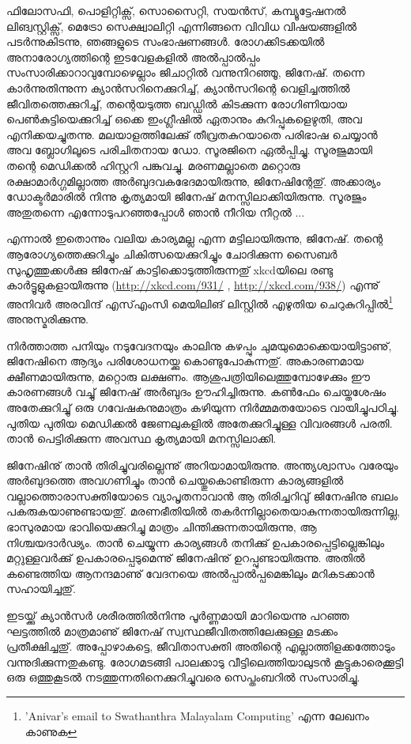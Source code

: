 ഫിലോസഫി, പൊളിറ്റിക്സ്, സൊസൈറ്റി, സയന്‍സ്, കമ്പ്യൂട്ടേഷനല്‍ ലിങ്വസ്റ്റിക്സ്, മെട്രോ സെക്ഷ്വാലിറ്റി എന്നിങ്ങനെ വിവിധ 
വിഷയങ്ങളില്‍ പടര്‍ന്നുകിടന്നു, ഞങ്ങളുടെ സംഭാഷണങ്ങള്‍. രോഗക്കിടക്കയില്‍ അനാരോഗ്യത്തിന്റെ ഇടവേളകളില്‍ 
അല്‍പ്പാല്‍പ്പം സംസാരിക്കാറാവുമ്പോഴെല്ലാം ജിചാറ്റില്‍ വന്നുനിറഞ്ഞൂ, ജിനേഷ്. തന്നെ കാര്‍ന്നുതിന്നുന്ന ക്യാന്‍സറിനെക്കുറിച്ച്, 
ക്യാന്‍സറിന്റെ വെളിച്ചത്തില്‍ ജീവിതത്തെക്കുറിച്ച്, തന്റെയടുത്ത ബഡ്ഡില്‍ കിടക്കുന്ന രോഗിണിയായ പെണ്‍കുട്ടിയെക്കുറിച്ച് 
ഒക്കെ ഇംഗ്ലീഷില്‍ ഏതാനും കുറിപ്പുകളെഴുതി, അവ എനിക്കയച്ചുതന്നു. മലയാളത്തിലേക്കു് തീവ്രതകുറയാതെ പരിഭാഷ ചെയ്യാന്‍ 
അവ ബ്ലോഗിലൂടെ പരിചിതനായ ഡോ. സൂരജിനെ ഏല്‍പ്പിച്ചു. സൂരജുമായി തന്റെ മെഡിക്കല്‍ ഹിസ്റ്ററി പങ്കുവച്ചു. മരണമല്ലാതെ 
മറ്റൊരു രക്ഷാമാര്‍ഗ്ഗമില്ലാത്ത അര്‍ബുദവകഭേദമായിരുന്നു, ജിനേഷിന്റേതു്. അക്കാര്യം ഡോക്ടര്‍മാരില്‍ നിന്നു കൃത്യമായി 
ജിനേഷ് മനസ്സിലാക്കിയിരുന്നു. സൂരജും അതുതന്നെ എന്നോടുപറഞ്ഞപ്പോള്‍ ഞാന്‍ നീറിയ നീറ്റല്‍ ...

എന്നാല്‍ ഇതൊന്നും വലിയ കാര്യമല്ല എന്ന മട്ടിലായിരുന്നു, ജിനേഷ്. തന്റെ ആരോഗ്യത്തെക്കുറിച്ചും ചികിത്സയെക്കുറിച്ചും 
ചോദിക്കുന്ന സൈബര്‍ സുഹൃത്തുക്കള്‍ക്കു ജിനേഷ് കാട്ടിക്കൊടുത്തിരുന്നതു് xkcdയിലെ രണ്ടു കാര്‍ട്ടൂളുകളായിരുന്നു 
(\url{http://xkcd.com/931/}  , \url{http://xkcd.com/938/}) എന്നു് അനിവര്‍ അരവിന്ദ് എസ്എംസി മെയിലിങ് ലിസ്റ്റില്‍ എഴുതിയ 
ചെറുകുറിപ്പില്‍\footnote{'Anivar's email to Swathanthra Malayalam Computing' എന്ന ലേഖനം കാണുക} അനുസ്മരിക്കുന്നു. 

നിര്‍ത്താത്ത പനിയും നടുവേദനയും കാലിനു കഴപ്പും ചുമയുമൊക്കെയായിട്ടാണു്, ജിനേഷിനെ ആദ്യം പരിശോധനയ്ക്കു 
കൊണ്ടുപോകുന്നതു്. അകാരണമായ ക്ഷീണമായിരുന്നു, മറ്റൊരു ലക്ഷണം. ആശുപത്രിയിലെത്തുമ്പോഴേക്കും ഈ 
കാരണങ്ങള്‍ വച്ചു് ജിനേഷ് അര്‍ബുദം ഊഹിച്ചിരുന്നു. കണ്‍ഫേം ചെയ്തശേഷം അതേക്കുറിച്ചു് ഒരു ഗവേഷകനുമാത്രം 
കഴിയുന്ന നിര്‍മ്മമതയോടെ വായിച്ചുപഠിച്ചു. പുതിയ പുതിയ മെഡിക്കല്‍ ജേണലുകളില്‍ അതേക്കുറിച്ചുള്ള വിവരങ്ങള്‍ പരതി. 
താന്‍ പെട്ടിരിക്കുന്ന അവസ്ഥ കൃത്യമായി മനസ്സിലാക്കി.

ജിനേഷിനു് താന്‍ തിരിച്ചുവരില്ലെന്നു് അറിയാമായിരുന്നു. അന്ത്യശ്വാസം വരേയും അര്‍ബുദത്തെ അവഗണിച്ചും താന്‍ 
ചെയ്തുകൊണ്ടിരുന്ന കാര്യങ്ങളില്‍ വല്ലാത്തൊരാസക്തിയോടെ വ്യാപൃതനാവാന്‍ ആ തിരിച്ചറിവു് ജിനേഷിനു ബലം 
പകരുകയാണുണ്ടായതു്. മരണഭീതിയില്‍ തകര്‍ന്നില്ലാതെയാകുന്നതായിരുന്നില്ല, ഭാസുരമായ ഭാവിയെക്കുറിച്ചു മാത്രം 
ചിന്തിക്കുന്നതായിരുന്നു, ആ നിശ്ചയദാര്‍ഢ്യം. താന്‍ ചെയ്യുന്ന കാര്യങ്ങള്‍ തനിക്കു് ഉപകാരപ്പെട്ടില്ലെങ്കിലും മറ്റുള്ളവര്‍ക്കു് 
ഉപകാരപ്പെടുമെന്നു് ജിനേഷിനു് ഉറപ്പുണ്ടായിരുന്നു. അതില്‍ കണ്ടെത്തിയ ആനന്ദമാണു് വേദനയെ അല്‍പ്പാല്‍പ്പമെങ്കിലും 
മറികടക്കാന്‍ സഹായിച്ചതു്.

ഇടയ്ക്കു് ക്യാന്‍സര്‍ ശരീരത്തില്‍നിന്നു പൂര്‍ണ്ണമായി മാറിയെന്നു പറഞ്ഞ ഘട്ടത്തില്‍ മാത്രമാണു് ജിനേഷ് 
സ്വസ്ഥജീവിതത്തിലേക്കുള്ള മടക്കം പ്രതീക്ഷിച്ചതു്. അപ്പോഴാകട്ടെ, ജീവിതാസക്തി അതിന്റെ എല്ലാത്തിളക്കത്തോടും 
വന്നുദിക്കുന്നതുകണ്ടു. രോഗമടങ്ങി പാലക്കാടു വീട്ടിലെത്തിയാലുടന്‍ കൂട്ടുകാരെക്കൂട്ടി ഒരു ഒത്തുകൂടല്‍ നടത്തുന്നതിനെക്കുറിച്ചുവരെ 
സെപ്തംബറില്‍ സംസാരിച്ചു.

